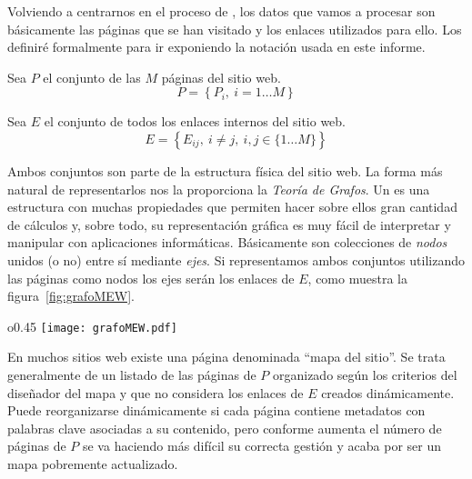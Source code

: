Volviendo a centrarnos en el proceso de \WUM, los datos que vamos a procesar son básicamente las páginas que se han visitado y los enlaces utilizados para ello. Los definiré formalmente para ir exponiendo la notación usada en este informe.

\begin{defn}\label{def:1-2-4-cjto-paginasSW}
   Sea $P$ el conjunto de las $M$ páginas del sitio web.
  \begin{equation}\label{eq:1-2-4-cjto-paginasSW}
    P = \left\{P_i,\ i=1\ldots M\right\}
  \end{equation}
\end{defn}

\begin{defn}\label{def:1-2-4-cjto-enlacesInternos}
   Sea $E$ el conjunto de todos los enlaces internos del sitio web.
  \begin{equation}\label{eq:1-2-4-cjto-enlacesSW}
    E = \left\{E_{ij},\ i\neq j,\ i,j\in\{1\ldots M\}\right\}
  \end{equation}
\end{defn}

Ambos conjuntos son parte de la estructura física del sitio web. La forma más natural de representarlos nos la proporciona la \emph{Teoría de Grafos}. Un \grafo es una estructura con muchas propiedades que permiten hacer sobre ellos gran cantidad de cálculos y, sobre todo, su representación gráfica es muy fácil de interpretar y manipular con aplicaciones informáticas. Básicamente son colecciones de \emph{nodos} unidos (o no) entre sí mediante \emph{ejes}. Si representamos ambos conjuntos utilizando las páginas como nodos los ejes serán los enlaces de $E$, como muestra la figura~\ref{fig:grafoMEW}.

\begin{wrapfigure}{o}{0.45\textwidth}
  \centering
  \texttt{[image: grafoMEW.pdf]}
	\caption[Estructura del sitio web]{\small Estructura del sitio web}
	\label{fig:grafoMEW}
\end{wrapfigure}
En muchos sitios web existe una página denominada "`mapa del sitio"'. Se trata generalmente de un listado de las páginas de $P$ organizado según los criterios del diseñador del mapa y que no considera los enlaces de $E$ creados dinámicamente. Puede reorganizarse dinámicamente si cada página contiene metadatos con palabras clave asociadas a su contenido, pero conforme aumenta el número de páginas de $P$ se va haciendo más difícil su correcta gestión y acaba por ser un mapa pobremente actualizado.

